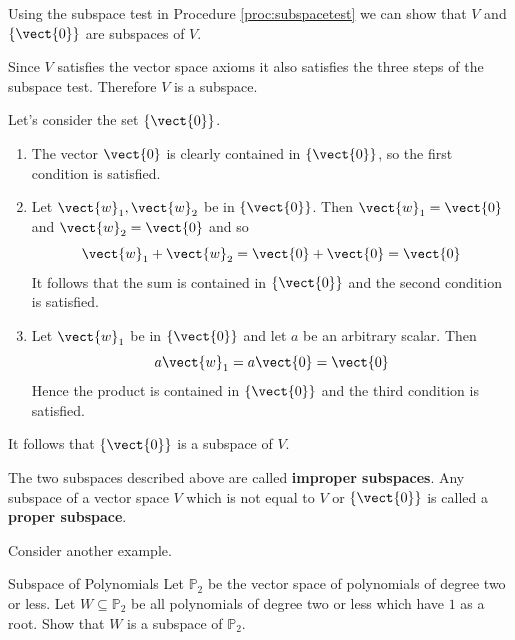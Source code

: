 \begin{solution}
Using the subspace test in Procedure \ref{proc:subspacetest} we can show that $V$ and $\left\{ \vect{0} \right\}$ are subspaces of $V$. 

Since $V$ satisfies the vector space axioms it also satisfies the three steps of the subspace test. Therefore $V$ is a subspace.

Let's consider the set $\left\{ \vect{0} \right\}$. 
\begin{enumerate}
\item
The vector $\vect{0}$ is clearly contained in  $\left\{ \vect{0} \right\}$, so the first condition is satisfied.

\item
Let $\vect{w}_1, \vect{w}_2$ be in  $\left\{ \vect{0} \right\}$. Then $\vect{w}_1 = \vect{0}$ and $\vect{w}_2 = \vect{0}$ and so 
\[
\vect{w}_1 + \vect{w}_2 = \vect{0} + \vect{0} = \vect{0}
\]
It follows that the sum is contained in $\left\{ \vect{0} \right\}$ and the second condition is satisfied. 

\item
Let $\vect{w}_1$ be in  $\left\{ \vect{0} \right\}$ and let $a$ be an arbitrary scalar. Then
\[
a\vect{w}_1  = a\vect{0} = \vect{0}
\]
Hence the product is contained in  $\left\{ \vect{0} \right\}$ and the third condition is satisfied. 
\end{enumerate}

It follows that  $\left\{ \vect{0} \right\}$ is a subspace of $V$. 
\end{solution}

The two subspaces described above are called \textbf{improper subspaces}. Any subspace of a vector space $V$ which is not equal to $V$ or  $\left\{ \vect{0} \right\}$ is called a \textbf{proper subspace}. 

Consider another example.

\begin{example}{Subspace of Polynomials}\label{exa:polysubspace}
Let $\mathbb{P}_2$ be the vector space of polynomials of degree two or less. Let $W \subseteq \mathbb{P}_2$ be all polynomials of degree two or less which have $1$ as a root. Show that $W$ is a subspace of $\mathbb{P}_2$. 
\end{example}

